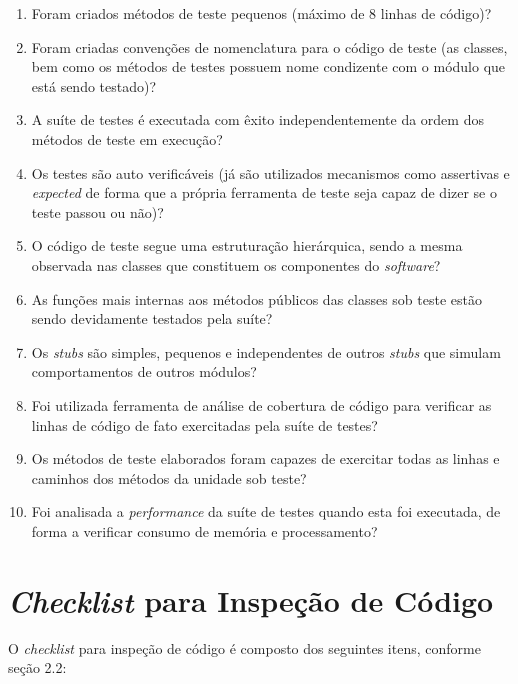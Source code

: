 \begin{enumerate}
	\item Foram criados métodos de teste pequenos (máximo de 8 linhas de código)?
	\item Foram criadas convenções de nomenclatura para o código de teste (as classes, bem como os métodos de testes possuem nome condizente com o módulo que está sendo testado)?
	\item A suíte de testes é executada com êxito independentemente da ordem dos métodos de teste em execução?
	\item Os testes são auto verificáveis (já são utilizados mecanismos como assertivas e \textit{expected} de forma que a própria ferramenta de teste seja capaz de dizer se o teste passou ou não)?
	\item O código de teste segue uma estruturação hierárquica, sendo a mesma observada nas classes que constituem os componentes do \textit{software}?
	\item As funções mais internas aos métodos públicos das classes sob teste estão sendo devidamente testados pela suíte?
	\item Os \textit{stubs} são simples, pequenos e independentes de outros \textit{stubs} que simulam comportamentos de outros módulos?
	\item Foi utilizada ferramenta de análise de cobertura de código para verificar as linhas de código de fato exercitadas pela suíte de testes?
	\item Os métodos de teste elaborados foram capazes de exercitar todas as linhas e caminhos dos métodos da unidade sob teste?
	\item Foi analisada a \textit{performance} da suíte de testes quando esta foi executada, de forma a verificar consumo de memória e processamento?
\end{enumerate}

\section{\textit{Checklist} para Inspeção de Código}

O \textit{checklist} para inspeção de código é composto dos seguintes itens, conforme seção 2.2:

